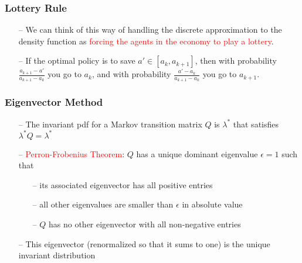 \documentclass[aspectratio=169, 11pt]{beamer}
\begin{document}
\begin{frame}
\frametitle{Lottery Rule}
  \begin{itemize}
    \item[--] We can think of this way of handling the discrete approximation to the density function as \textcolor{red}{forcing the agents in the economy to play a lottery}.
    \bigskip
    \item[--] If the optimal policy is to save $a'\in\left[a_{k},a_{k+1}\right]$, then with probability $\frac{a_{k+1}-a'}{a_{k+1}-a_{k}}$ you go to $a_{k}$, and with probability $\frac{a'-a_{k}}{a_{k+1}-a_{k}}$ you go to $a_{k+1}$.
  \end{itemize}
\end{frame}

\begin{frame}
\frametitle{Eigenvector Method}
  \begin{itemize}
    \item[--] The invariant pdf for a Markov transition matrix $Q$ is $\lambda^{*}$ that satisfies $\lambda^{*}Q=\lambda^{*}$
    \bigskip
    \item[--] \textcolor{red}{Perron-Frobenius Theorem}: $Q$ has a unique dominant eigenvalue $\epsilon=1$ such that
    \begin{itemize}
      \medskip
      \item[--] its associated eigenvector has all positive entries
      \medskip
      \item[--] all other eigenvalues are smaller than $\epsilon$ in absolute value
      \medskip
      \item[--] $Q$ has no other eigenvector with all non-negative entries
    \end{itemize}
    \bigskip
    \item[--] This eigenvector (renormalized so that it sums to one) is the unique invariant distribution
  \end{itemize}
\end{frame}
\end{document}
